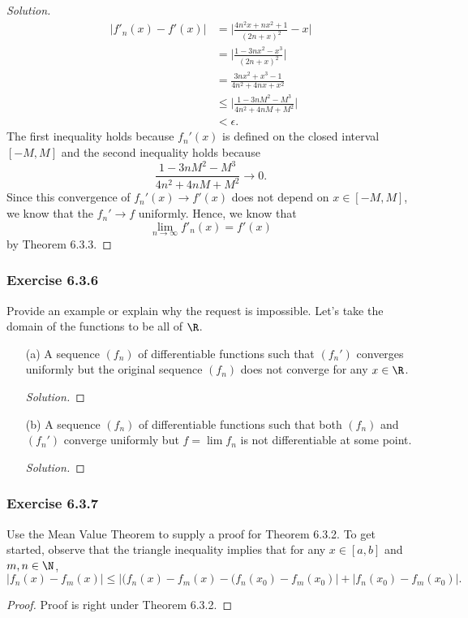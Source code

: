 \begin{enumerate}
\begin{proof}[Solution]
        \begin{align*}
            | f'_n(x) - f'(x)| &=  \Big| \frac{ 4n^2x + nx^2 + 1  }{ (2n+x)^2 } - x   \Big|  \\
                               &= \Big| \frac{ 1 - 3nx^2 - x^3  }{ (2n+x)^2 }  \Big| \\
                               &= \frac{ 3nx^2 + x^3 - 1  }{ 4n^2 + 4nx + x^2 } \\
                                &\leq \Big| \frac{ 1 - 3nM^2 - M^3  }{ 4n^2 + 4nM + M^2 }  \Big| \\ 
                                &< \epsilon.
        \end{align*}
        The first inequality holds because \( f_n'(x)  \) is defined on the closed interval \( [-M, M ] \) and the second inequality holds because 
        \[  \frac{ 1 - 3nM^2 - M^3   }{  4n^2 + 4nM + M^2  } \to 0.\]
        Since this convergence of \( f_n'(x) \to f'(x)  \) does not depend on \( x  \in [-M, M ] \), we know that the \( f_n' \to f  \) uniformly. Hence, we know that 
        \[  \lim_{ n \to \infty  } f'_n(x) = f'(x) \]
        by Theorem 6.3.3.
        \end{proof}
\end{enumerate}

\subsubsection{Exercise 6.3.6} Provide an example or explain why the request is impossible. Let's take the domain of the functions to be all of \( \R  \).

\begin{enumerate}
    \item[(a)] A sequence \( (f_n)  \) of differentiable functions such that \( (f_n') \) converges uniformly but the original sequence \( (f_n)  \) does not converge for any \( x \in \R  \).
        \begin{proof}[Solution]
        
        \end{proof}
    \item[(b)] A sequence \( (f_n) \) of differentiable functions such that both \( (f_n)  \) and \( (f_n') \) converge uniformly but \( f = \lim f_n \) is not differentiable at some point.
        \begin{proof}[Solution]
        
        \end{proof}
\end{enumerate}

\subsubsection{Exercise 6.3.7} Use the Mean Value Theorem to supply a proof for Theorem 6.3.2. To get started, observe that the triangle inequality implies that for any \( x \in [a,b]  \) and \( m,n \in \N  \),
\[ | f_n(x) - f_m(x)  |  \leq | (f_n(x) - f_m(x) - (f_n(x_0) - f_m(x_0)  | + | f_n(x_0) -f_m(x_0) |. \]
\begin{proof}
Proof is right under Theorem 6.3.2.
\end{proof}

